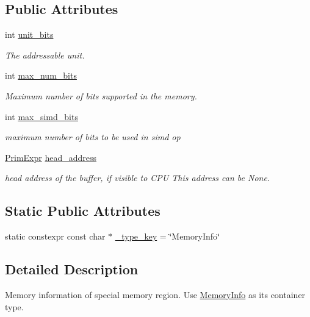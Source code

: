 \subsection*{Public Attributes}
\begin{DoxyCompactItemize}
\item 
int \hyperlink{classtvm_1_1MemoryInfoNode_aa935f1ee9d8d2f06633ca4b3c44f7725}{unit\+\_\+bits}
\begin{DoxyCompactList}\small\item\em The addressable unit. \end{DoxyCompactList}\item 
int \hyperlink{classtvm_1_1MemoryInfoNode_ae0b6f9572f77177a08a8a522d1ec2aa4}{max\+\_\+num\+\_\+bits}
\begin{DoxyCompactList}\small\item\em Maximum number of bits supported in the memory. \end{DoxyCompactList}\item 
int \hyperlink{classtvm_1_1MemoryInfoNode_aededa36e61d4f423bd363519d8d17809}{max\+\_\+simd\+\_\+bits}
\begin{DoxyCompactList}\small\item\em maximum number of bits to be used in simd op \end{DoxyCompactList}\item 
\hyperlink{classtvm_1_1PrimExpr}{Prim\+Expr} \hyperlink{classtvm_1_1MemoryInfoNode_af2e6ca44c6258c7c743482ae6f7c7deb}{head\+\_\+address}
\begin{DoxyCompactList}\small\item\em head address of the buffer, if visible to C\+PU This address can be None. \end{DoxyCompactList}\end{DoxyCompactItemize}
\subsection*{Static Public Attributes}
\begin{DoxyCompactItemize}
\item 
static constexpr const char $\ast$ \hyperlink{classtvm_1_1MemoryInfoNode_a679e07b35ff1da70063e3146e7cbb9dd}{\+\_\+type\+\_\+key} = \char`\"{}Memory\+Info\char`\"{}
\end{DoxyCompactItemize}


\subsection{Detailed Description}
Memory information of special memory region. Use \hyperlink{classtvm_1_1MemoryInfo}{Memory\+Info} as its container type. 


